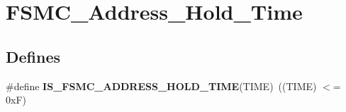 \hypertarget{group__FSMC__Address__Hold__Time}{
\section{FSMC\_\-Address\_\-Hold\_\-Time}
\label{group__FSMC__Address__Hold__Time}
}
\subsection*{Defines}
\begin{DoxyCompactItemize}
\item 
\hypertarget{group__FSMC__Address__Hold__Time_gae7d031a5b95ad00acf67e9bc95064998}{
\#define {\bfseries IS\_\-FSMC\_\-ADDRESS\_\-HOLD\_\-TIME}(TIME)~((TIME) $<$= 0xF)}
\label{group__FSMC__Address__Hold__Time_gae7d031a5b95ad00acf67e9bc95064998}

\end{DoxyCompactItemize}
